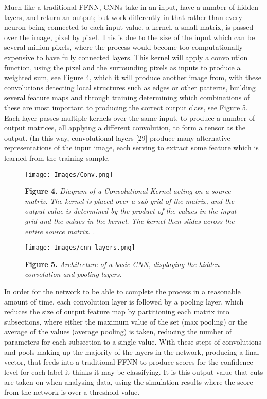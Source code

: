 \noindent Much like a traditional FFNN, CNNs take in an input, have a number of hidden layers, and return an output; but work differently in that rather than every neuron being connected to each input value, a kernel, a small matrix, is passed over the image, pixel by pixel. This is due to the size of the input which can be several million pixels, where the process would become too computationally expensive to have fully connected layers. This kernel will apply a convolution function, using the pixel and the surrounding pixels as inputs to produce a weighted sum, see Figure 4, which it will produce another image from, with these convolutions detecting local structures \cite{Brenzke} such as edges or other patterns, building several feature maps and through training determining which combinations of these are most important to producing the correct output class, see Figure 5. Each layer passes multiple kernels over the same input, to produce a number of output matrices, all applying a different convolution, to form a tensor as the output.  (In this way, convolutional layers [29] produce many alternative representations of the input image, each serving to extract some feature which is learned from the training sample. \medskip

\begin{figure}[t]
 \centering
 \texttt{[image: Images/Conv.png]} 
 
 \textbf{Figure 4.} \textit{Diagram of a Convolutional Kernel acting on a source matrix. The kernel is placed over a sub grid of the matrix, and the output value is determined by the product of the values in the input grid and the values in the kernel. The kernel then slides across the entire source matrix. \cite{Brenzke}.}
 \end{figure}
 
 \begin{figure}
 \centering
 \texttt{[image: Images/cnn\_layers.png]} 
 
  \textbf{Figure 5.} \textit{Architecture of a basic CNN, displaying the hidden convolution and pooling layers.}
 \end{figure}

\noindent In order for the network to be able to complete the process in a reasonable amount of time, each convolution layer is followed by a pooling layer, which reduces the size of output feature map by partitioning each matrix into subsections, where either the maximum value of the set (max pooling) or the average of the values (average pooling) is taken, reducing the number of parameters for each subsection to a single value. With these steps of convolutions and pools making up the majority of the layers in the network, producing a final vector, that feeds into a traditional FFNN to produce scores for the confidence level for each label it thinks it may be classifying. It is this output value that cuts are taken on when analysing data, using the simulation results where the score from the network is over a threshold value. \medskip

